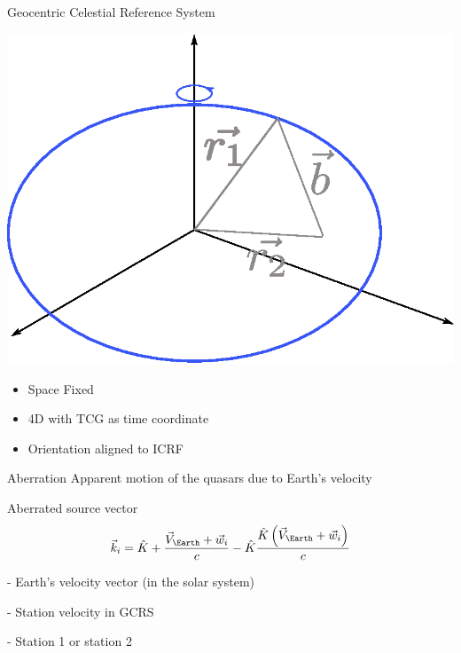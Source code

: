\documentclass[14pt,table,t, c]{beamer}
\begin{document}
\begin{frame}{Geocentric Celestial Reference System}
\begin{minipage}[t][][c]{0.48\linewidth}
	\includegraphics[width=\linewidth]{figure/gcrs}
\end{minipage}
\begin{minipage}[t][][c]{0.5\linewidth}
\begin{itemize}
\item Space Fixed
\item 4D with TCG as time coordinate
\item Orientation aligned to ICRF
\end{itemize}
\end{minipage}
\end{frame}

\begin{frame}{Aberration}
Apparent motion of the quasars due to Earth's velocity
\begin{block}{Aberrated source vector}
\vspace*{-\baselineskip}\setlength\belowdisplayskip{0pt}\setlength\abovedisplayskip{0pt}
\begin{equation*}
\vec{k}_i = \hat{K} + \frac{\vec{V}_{\Earth} + \vec{w}_i}{c} - \hat{K}\frac{\hat{K}\left(\vec{V}_{\Earth} + \vec{w}_i\right)}{c}
\end{equation*}
\end{block}
\begin{description}
\item[$\vec{V}_{\Earth}$] - Earth's velocity vector (in the solar system) \\
\item[$\vec{w}_i$] - Station velocity in GCRS \\
\item[$i$] - Station 1 or station 2
\end{description}
\end{frame}
\end{document}
